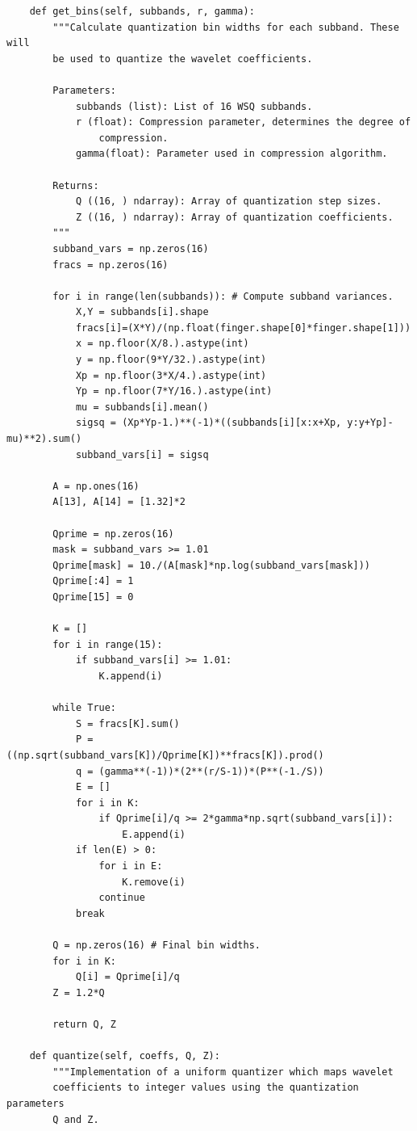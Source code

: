 \begin{lstlisting}
    def get_bins(self, subbands, r, gamma):
        """Calculate quantization bin widths for each subband. These will
        be used to quantize the wavelet coefficients.

        Parameters:
            subbands (list): List of 16 WSQ subbands.
            r (float): Compression parameter, determines the degree of
                compression.
            gamma(float): Parameter used in compression algorithm.

        Returns:
            Q ((16, ) ndarray): Array of quantization step sizes.
            Z ((16, ) ndarray): Array of quantization coefficients.
        """
        subband_vars = np.zeros(16)
        fracs = np.zeros(16)

        for i in range(len(subbands)): # Compute subband variances.
            X,Y = subbands[i].shape
            fracs[i]=(X*Y)/(np.float(finger.shape[0]*finger.shape[1]))
            x = np.floor(X/8.).astype(int)
            y = np.floor(9*Y/32.).astype(int)
            Xp = np.floor(3*X/4.).astype(int)
            Yp = np.floor(7*Y/16.).astype(int)
            mu = subbands[i].mean()
            sigsq = (Xp*Yp-1.)**(-1)*((subbands[i][x:x+Xp, y:y+Yp]-mu)**2).sum()
            subband_vars[i] = sigsq

        A = np.ones(16)
        A[13], A[14] = [1.32]*2

        Qprime = np.zeros(16)
        mask = subband_vars >= 1.01
        Qprime[mask] = 10./(A[mask]*np.log(subband_vars[mask]))
        Qprime[:4] = 1
        Qprime[15] = 0

        K = []
        for i in range(15):
            if subband_vars[i] >= 1.01:
                K.append(i)

        while True:
            S = fracs[K].sum()
            P = ((np.sqrt(subband_vars[K])/Qprime[K])**fracs[K]).prod()
            q = (gamma**(-1))*(2**(r/S-1))*(P**(-1./S))
            E = []
            for i in K:
                if Qprime[i]/q >= 2*gamma*np.sqrt(subband_vars[i]):
                    E.append(i)
            if len(E) > 0:
                for i in E:
                    K.remove(i)
                continue
            break

        Q = np.zeros(16) # Final bin widths.
        for i in K:
            Q[i] = Qprime[i]/q
        Z = 1.2*Q

        return Q, Z

    def quantize(self, coeffs, Q, Z):
        """Implementation of a uniform quantizer which maps wavelet
        coefficients to integer values using the quantization parameters
        Q and Z.


\end{lstlisting}

